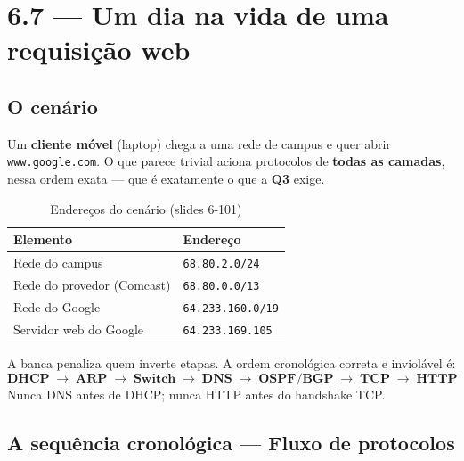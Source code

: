\documentclass[11pt,a4paper]{article}
\begin{document}
\hrulefill

\section{6.7 --- Um dia na vida de uma requisição web}

\subsection{O cenário}

Um \textbf{cliente móvel} (laptop) chega a uma rede de campus e quer abrir \texttt{www.google.com}. O que parece trivial aciona protocolos de \textbf{todas as camadas}, nessa ordem exata --- que é exatamente o que a \textbf{Q3} exige.

\begin{table}[h!]
\centering
\caption{Endereços do cenário (slides 6-101)}
\label{tab:cenario67}
\begin{tabular}{ll}
\toprule
\textbf{Elemento} & \textbf{Endereço} \\
\midrule
Rede do campus & \texttt{68.80.2.0/24} \\
Rede do provedor (Comcast) & \texttt{68.80.0.0/13} \\
Rede do Google & \texttt{64.233.160.0/19} \\
Servidor web do Google & \texttt{64.233.169.105} \\
\bottomrule
\end{tabular}
\end{table}

\begin{prova}
A banca penaliza quem inverte etapas. A ordem cronológica correta e inviolável é:
\[
\textbf{DHCP} \;\longrightarrow\; \textbf{ARP} \;\longrightarrow\; \textbf{Switch} \;\longrightarrow\; \textbf{DNS} \;\longrightarrow\; \textbf{OSPF/BGP} \;\longrightarrow\; \textbf{TCP} \;\longrightarrow\; \textbf{HTTP}
\]
Nunca DNS antes de DHCP; nunca HTTP antes do handshake TCP.
\end{prova}

\subsection{A sequência cronológica --- Fluxo de protocolos}
\end{document}
